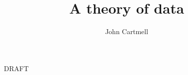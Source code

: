 \documentclass[10pt,a4paper]{article}
\begin{document}
\title{A theory of data}
\author{John Cartmell}
\maketitle
\begin{center}
DRAFT
\end{center}


% 




%

% 
%
	 
\end{document}
